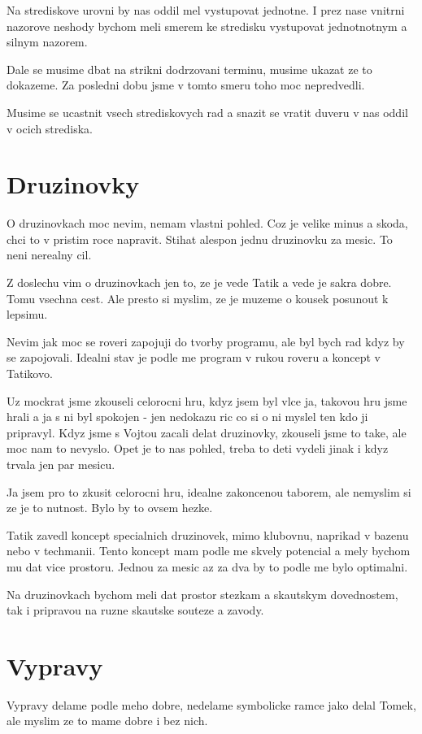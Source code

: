 \documentclass[12pt,a4paper]{article}
\begin{document}
Na strediskove urovni by nas oddil mel vystupovat jednotne. I prez nase vnitrni nazorove neshody bychom meli smerem ke stredisku vystupovat jednotnotnym a silnym nazorem.

Dale se musime dbat na strikni dodrzovani terminu, musime ukazat ze to dokazeme. Za posledni dobu jsme v tomto smeru toho moc nepredvedli.

Musime se ucastnit vsech strediskovych rad a snazit se vratit duveru v nas oddil v ocich strediska.

\section{Druzinovky}

O druzinovkach moc nevim, nemam vlastni pohled. Coz je velike minus a skoda, chci to v pristim roce napravit. Stihat alespon jednu druzinovku za mesic. To neni nerealny cil.

Z doslechu vim o druzinovkach jen to, ze je vede Tatik a vede je sakra dobre. Tomu vsechna cest. Ale presto si myslim, ze je muzeme o kousek posunout k lepsimu.

Nevim jak moc se roveri zapojuji do tvorby programu, ale byl bych rad kdyz by se zapojovali. Idealni stav je podle me program v rukou roveru a koncept v Tatikovo.

Uz mockrat jsme zkouseli celorocni hru, kdyz jsem byl vlce ja, takovou hru jsme hrali a ja s ni byl spokojen - jen nedokazu ric co si o ni myslel ten kdo ji pripravyl. Kdyz jsme s Vojtou zacali delat druzinovky, zkouseli jsme to take, ale moc nam to nevyslo. Opet je to nas pohled, treba to deti vydeli jinak i kdyz trvala jen par mesicu.

Ja jsem pro to zkusit celorocni hru, idealne zakoncenou taborem, ale nemyslim si ze je to nutnost. Bylo by to ovsem hezke.

Tatik zavedl koncept specialnich druzinovek, mimo klubovnu, naprikad v bazenu nebo v techmanii. Tento koncept mam podle me skvely potencial a mely bychom mu dat vice prostoru. Jednou za mesic az za dva by to podle me bylo optimalni.

Na druzinovkach bychom meli dat prostor stezkam a skautskym dovednostem, tak i pripravou na ruzne skautske souteze a zavody.


\section{Vypravy}

Vypravy delame podle meho dobre, nedelame symbolicke ramce jako delal Tomek, ale myslim ze to mame dobre i bez nich.
\end{document}
